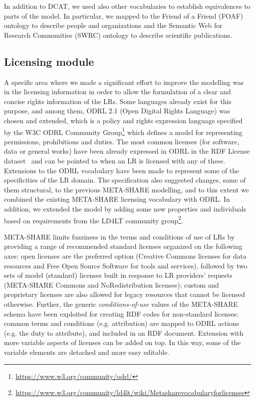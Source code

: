 \documentclass{llncs}
\begin{document}
In addition to DCAT, we used also other vocabularies to establish equivalences to parts of the model. In particular, we mapped to the Friend of
a Friend (FOAF) ontology to describe people and organizations and the Semantic
Web for Research Communities (SWRC) ontology to describe scientific
publications.

\subsection{Licensing module}
\label{sec:licensing}

A specific area where we made a significant effort to improve the modelling was
in the licensing information in order to allow the formulation of a clear and
concise rights information of the LRs. 
Some languages already exist for this purpose, and among them, ODRL 2.1 (Open Digital Rights Language) was
chosen and extended, which is a policy and rights
expression language specified by the W3C ODRL Community
Group\footnote{\url{https://www.w3.org/community/odrl/}} which defines a model
for representing permissions, prohibitions and duties.
The most common licenses (for software, data or general works) have been already
expressed in ODRL in the RDF License dataset~\cite{rdflicense} and can be pointed to when an LR is licensed with any of these.
Extensions to the ODRL vocabulary have been made to represent some of the specificities
of the LR domain. The specification also suggested changes, some of them
structural, to the previous META-SHARE modelling, and to this extent we
combined the existing META-SHARE licensing vocabulary with ODRL.
In addition, we extended the model by adding some new properties and individuals
based on requirements from the LD4LT community group\footnote{\url{https://www.w3.org/community/ld4lt/wiki/Metasharevocabularyforlicenses}}.

META-SHARE limits fuzziness in the terms and conditions of use of LRs by
providing a range of recommended standard licenses organized on the following axes: open licenses are the preferred option (Creative Commons licenses for data resources and Free Open Source Software for tools and
services), followed by two sets of model (standard) licenses built in response
to LR providers' requests (META-SHARE Commons and NoRedistribution licenses);
custom and proprietary licenses are also allowed for legacy
resources that cannot be licensed otherwise. 
Further, the generic \textit{conditions-of-use} values of the META-SHARE schema have been exploited for
creating RDF codes for non-standard licenses: common terms and conditions (e.g. attribution) are mapped to ODRL
actions (e.g. the duty to attribute), and included in an RDF
document. Extension with more variable aspects of licenses can be added on top. In this way, some of the variable
elements are detached and more easy editable. 
\end{document}
